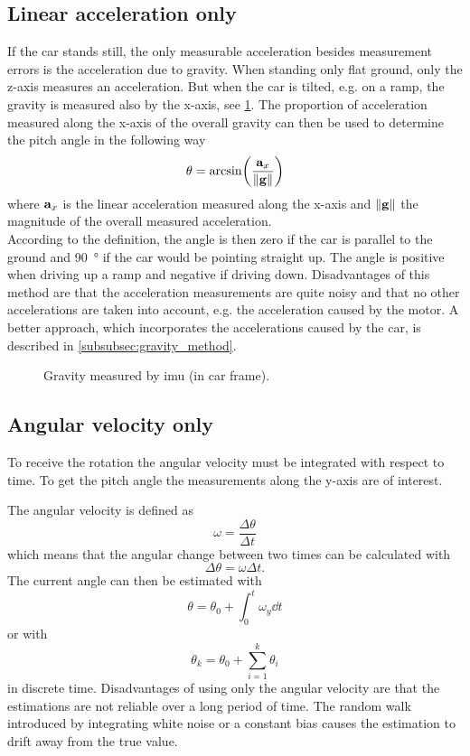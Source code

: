 \subsection{Linear acceleration only}
\label{ssec:linear_acceleration_only}
If the car stands still, the only measurable acceleration besides measurement errors is the acceleration due to gravity.
When standing only flat ground, only the z-axis measures an acceleration.
But when the car is tilted, e.g. on a ramp, the gravity is measured also by the x-axis, see \cref{fig:tikz_car_gravity1}.
The proportion of acceleration measured along the x-axis of the overall gravity can then be used to determine the pitch angle in the following way
\begin{equation}
    \theta = \arcsin(\frac{\vb{a}_x}{\norm{\vb{g}}})
\end{equation}
where $\vb{a}_x$ is the linear acceleration measured along the x-axis and $\norm{\vb{g}}$ the magnitude of the overall measured acceleration.\\
According to the definition, the angle is then zero if the car is parallel to the ground and \SI{90}{\degree} if the car would be pointing straight up.
The angle is positive when driving up a ramp and negative if driving down.
Disadvantages of this method are that the acceleration measurements are quite noisy and that no other accelerations are taken into account, e.g. the acceleration caused by the motor.
A better approach, which incorporates the accelerations caused by the car, is described in \cref{subsubsec:gravity_method}.
\begin{figure}[htpb]
    \centering
    
    \caption{Gravity measured by \acrshort{imu} (in car frame).}
    \label{fig:tikz_car_gravity1}
\end{figure}

\subsection{Angular velocity only}
To receive the rotation the angular velocity must be integrated with respect to time.
To get the pitch angle the measurements along the y-axis are of interest.

The angular velocity is defined as
\begin{equation}
    \omega = \frac{\Delta\theta}{\Delta t}
\end{equation}
which means that the angular change between two times can be calculated with
\begin{equation}
    \Delta\theta = \omega\Delta t.
\end{equation}
The current angle can then be estimated with
\begin{equation}
    \theta = \theta_0 + \int_0^t \omega_y \dd{t}
\end{equation}
or with
\begin{equation}
    \theta_k = \theta_0 + \sum_{i = 1}^k \theta_i
\end{equation}
in discrete time.
Disadvantages of using only the angular velocity are that the estimations are not reliable over a long period of time.
The random walk introduced by integrating white noise or a constant bias causes the estimation to drift away from the true value.


